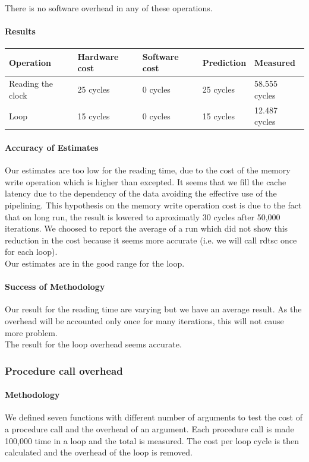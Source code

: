 There is no software overhead in any of these operations.

\paragraph{Results}

\begin{center}
\begin{tabular}{| l | l | l | l | l |}
\hline
Operation & Hardware cost & Software cost & Prediction & Measured \\
\hline
Reading the clock & 25 cycles & 0 cycles & 25 cycles & 58.555 cycles \\
\hline
Loop & 15 cycles & 0 cycles & 15 cycles & 12.487 cycles \\
\hline
\end{tabular}
\end{center}
\paragraph{Accuracy of Estimates}
Our estimates are too low for the reading time, due to the cost of the memory write operation which is
higher than excepted.
It seems that we fill the cache latency due to the dependency of the data
avoiding the effective use of the pipelining.
This hypothesis on the memory write operation cost is due to the fact that on long run,
the result is lowered to aproximatly 30 cycles after 50,000 iterations.
We choosed to report the average of a run which did not show this reduction in
the cost because it seems more accurate (i.e. we will call rdtsc once for each
loop).\\

Our estimates are in the good range for the loop.

\paragraph{Success of Methodology}
Our result for the reading time are varying but we have an average result. As
the overhead will be accounted only once for many iterations, this will not
cause more problem.\\

The result for the loop overhead seems accurate.

\subsubsection{Procedure call overhead}
\paragraph{Methodology}
We defined seven functions with different number of arguments to test the
cost of a procedure call and the overhead of an argument.
Each procedure call is made 100,000 time in a loop and the total is measured.
The cost per loop cycle is then calculated and the overhead of the loop is
removed.


